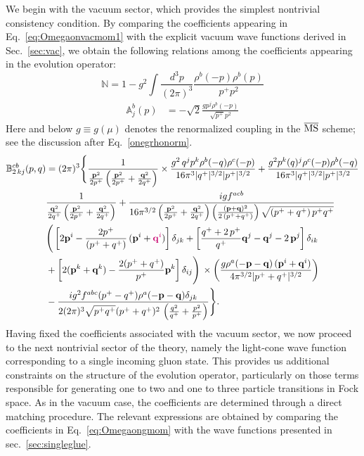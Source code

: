 \documentclass[a4paper,11pt]{article}
\def\v#1{\mathbf{#1}}
\def\mf#1{\mathbb{#1}}
\begin{document}
We begin with the vacuum sector, which provides the simplest nontrivial consistency condition. By comparing the coefficients appearing in Eq.~\eqref{eq:Omegaonvacmom1} with the explicit vacuum wave functions derived in Sec.~\ref{sec:vac}, we obtain the following relations among the coefficients appearing in the evolution operator:
\begin{equation}\label{Ncoeffmom}
    \mf{N} = 1- g^{2} \int \frac{d^3p} {(2\pi)^3} \frac{\rho^{b}(-p)\rho^{b}(p)}{p^{+}p^{2}}  
\end{equation}
\begin{align}
\label{A1coeffM}
    \mf{A}^{b}_{j}(p) & = -\sqrt{2} \frac{gp^{j}\rho^{b}(-p)}{ \sqrt{p^{+}}p^{2}} 
\end{align}
{\color{chg}Here and below $g\equiv g(\mu)$ denotes the renormalized coupling in the $\overline{\rm MS}$ scheme; see the discussion after Eq.~\eqref{onegrhonorm}.}
\begin{align}
     \mf{B}^{cb}_{2\,kj}(p,q) & = (2\pi)^{3}\Bigg\{\frac{1}{\frac{\mathbf{p}^{2}}{2p^{+}}\left(\frac{\mathbf{p}^{2}}{2p^{+}}+\frac{\mathbf{q}^{2}}{2q^{+}}\right)} \times \frac{g^{2}\,q^{j}p^{k}\rho^{b}(-q)\rho^{c}(-p)}{16\pi^{3}|q^{+}|^{3/2}|p^{+}|^{3/2}}+\frac{g^{2}p^{k}(q)^{j}\rho^{c}(-p)\rho^{b}(-q)}{16\pi^{3}|q^{+}|^{3/2}|p^{+}|^{3/2}}\notag \\ & \frac{1}{\frac{\mathbf{q}^{2}}{2q^{+}}\left(\frac{\mathbf{p}^{2}}{2p^{+}}+\frac{\mathbf{q}^{2}}{2q^{+}}\right)}  + \frac{igf^{acb}}{16\pi^{3/2}\left(\frac{\mathbf{p}^{2}}{2p^{+}}+\frac{\mathbf{q}^{2}}{2q^{+}}\right)\left(\frac{(\mathbf{p}+\mathbf{q})^{2}}{2\,(p^{+}+q^{+})}\right)\sqrt{(p^{+}+q^{+})\,p^{+}q^{+}}}\notag \\ & \Bigg(\left[2\mathbf{p}^{i}-\frac{2p^{+}}{(p^{+}+q^{+})}\,(\mathbf{p}^{i}+{\color{chg}\mathbf{q}^{i}})\right]\delta_{jk} +\left[\frac{q^{+}+2\,p^{+}}{q^{+}}\mathbf{q}^{j}-\mathbf{q}^{j}-2\,\mathbf{p}^{j}\right]\delta_{ik} \notag \\ & +\left[2(\mathbf{p}^{k}+\mathbf{q}^{k})-\frac{2(p^{+}+q^{+})}{p^{+}}\mathbf{p}^{k}\right]\delta_{ij}\Bigg)\,\times \left(\frac{g\rho^{a}(-\mathbf{p}-\mathbf{q})\,(\mathbf{p}^{i}+\mathbf{q}^{i})}{4\pi^{3/2}|p^{+}+q^{+}|^{3/2}}\right) \notag \\ & -\frac{ig^{2}f^{abc}(p^{+}-q^{+})\rho^{a}(-\v{p}-\v{q})\delta_{jk}}{2(2\pi)^{3}\sqrt{p^{+}q^{+}}(p^{+}+q^{+})^{2}\,\left(\frac{q^{2}}{q^{+}}+\frac{p^{2}}{p^{+}}\right)}\Bigg\}.
\end{align}
Having fixed the coefficients associated with the vacuum sector, we now proceed to the next nontrivial sector of the theory, namely the light-cone wave function corresponding to a single incoming gluon state. This provides us additional constraints on the structure of the evolution operator, particularly on those terms responsible for generating one to two and one to three particle transitions in Fock space. As in the vacuum case, the coefficients are determined through a direct matching procedure. The relevant expressions are obtained by comparing the coefficients in Eq.~\eqref{eq:Omegaongmom} with the wave functions presented in sec.~\ref{sec:singleglue}.
\end{document}
